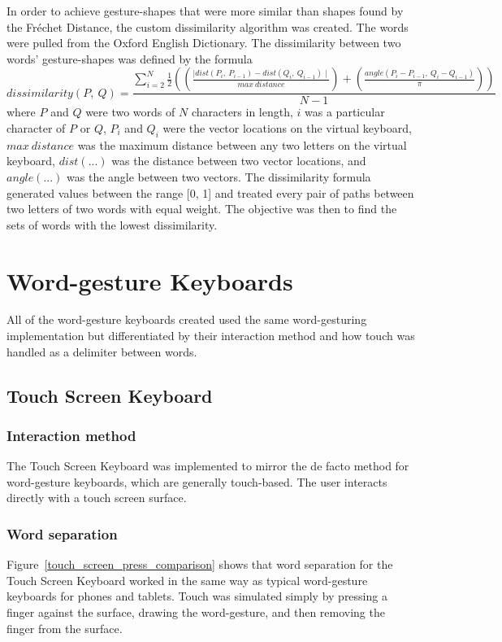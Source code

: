 In order to achieve gesture-shapes that were more similar than shapes found by the Fr\'echet Distance, the custom dissimilarity algorithm was created. The words were pulled from the Oxford English Dictionary. The dissimilarity between two words' gesture-shapes was defined by the formula
\begin{equation}
dissimilarity(P,\ Q) = \frac{\sum\limits_{i = 2}^{N} \frac{1}{2} \left(\left(\frac{\mid dist(P_{i},\ P_{i-1}) - dist(Q_{i},\ Q_{i-1})\mid}{max\ distance}\right) + \left(\frac{angle(P_{i} - P_{i-1},\ Q_{i} - Q_{i-1})}{\pi}\right)\right)}{N - 1}
\end{equation}
where $P$ and $Q$ were two words of $N$ characters in length, $i$ was a particular character of $P$ or $Q$, $P_i$ and $Q_i$ were the vector locations on the virtual keyboard, $max\ distance$ was the maximum distance between any two letters on the virtual keyboard, $dist(...)$ was the distance between two vector locations, and $angle(...)$ was the angle between two vectors. The dissimilarity formula generated values between the range [0, 1] and treated every pair of paths between two letters of two words with equal weight. The objective was then to find the sets of words with the lowest dissimilarity.

\section{Word-gesture Keyboards}
All of the word-gesture keyboards created used the same word-gesturing implementation but differentiated by their interaction method and how touch was handled as a delimiter between words.

\subsection{Touch Screen Keyboard}
\subsubsection{Interaction method}
The Touch Screen Keyboard was implemented to mirror the de facto method for word-gesture keyboards, which are generally touch-based. The user interacts directly with a touch screen surface.

\subsubsection{Word separation}
Figure~\ref{touch_screen_press_comparison} shows that word separation for the Touch Screen Keyboard worked in the same way as typical word-gesture keyboards for phones and tablets. Touch was simulated simply by pressing a finger against the surface, drawing the word-gesture, and then removing the finger from the surface.

